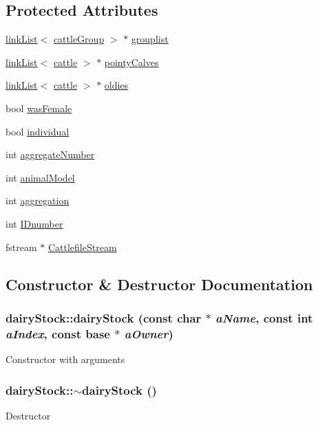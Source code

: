 \subsection*{Protected Attributes}
\begin{DoxyCompactItemize}
\item 
\hyperlink{classlink_list}{linkList}$<$ \hyperlink{classcattle_group}{cattleGroup} $>$ $\ast$ \hyperlink{classdairy_stock_ae22ba85aaf48cccf4c75117c270ece97}{grouplist}
\item 
\hyperlink{classlink_list}{linkList}$<$ \hyperlink{classcattle}{cattle} $>$ $\ast$ \hyperlink{classdairy_stock_aafba61b39765bdecf0a0e05281e5740c}{pointyCalves}
\item 
\hyperlink{classlink_list}{linkList}$<$ \hyperlink{classcattle}{cattle} $>$ $\ast$ \hyperlink{classdairy_stock_add52dfd62ac394215c6f9e6c9cac2f0f}{oldies}
\item 
bool \hyperlink{classdairy_stock_a4d15475e1ceb1b1108df48f0ed64b41e}{wasFemale}
\item 
bool \hyperlink{classdairy_stock_a01fc75f09a995c8a581ad7fc3f6b6c82}{individual}
\item 
int \hyperlink{classdairy_stock_aafdf20c05ee5cdb2981c917ce88feeb9}{aggregateNumber}
\item 
int \hyperlink{classdairy_stock_a65acaa98372497299dd6ff5790b75de2}{animalModel}
\item 
int \hyperlink{classdairy_stock_a53d25ed710cd6b61a960ca8694607ceb}{aggregation}
\item 
int \hyperlink{classdairy_stock_ac3387bde3c980dc1ff428d746e654aae}{IDnumber}
\item 
fstream $\ast$ \hyperlink{classdairy_stock_a90690d91a012a2e4db298b27b8751f9b}{CattlefileStream}
\end{DoxyCompactItemize}


\subsection{Constructor \& Destructor Documentation}
\hypertarget{classdairy_stock_aad9f7ae81dd17f7c347fcafbcfc94dda}{
\subsubsection[{dairyStock}]{\setlength{\rightskip}{0pt plus 5cm}dairyStock::dairyStock (const char $\ast$ {\em aName}, \/  const int {\em aIndex}, \/  const {\bf base} $\ast$ {\em aOwner})}}
\label{classdairy_stock_aad9f7ae81dd17f7c347fcafbcfc94dda}
Constructor with arguments \hypertarget{classdairy_stock_a9fe818e95a63fe96cc6f3b6da29c52cc}{
\subsubsection[{$\sim$dairyStock}]{\setlength{\rightskip}{0pt plus 5cm}dairyStock::$\sim$dairyStock ()}}
\label{classdairy_stock_a9fe818e95a63fe96cc6f3b6da29c52cc}
Destructor 

